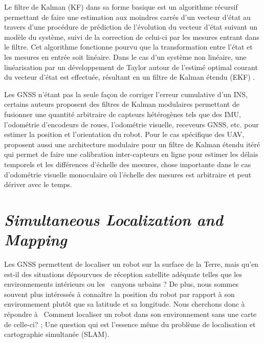 Le filtre de Kalman (KF) dans sa forme basique est un algorithme récursif permettant de faire une estimation aux moindres carrés d'un vecteur d'état au travers d'une procédure de prédiction de l'évolution du vecteur d'état suivant un modèle du système, suivi de la correction de celui-ci par les mesures entrant dans le filtre. Cet algorithme fonctionne pourvu que la transformation entre l'état et les mesures en entrée soit linéaire. Dans le cas d'un système non linéaire, une linéarisation par un développement de Taylor autour de l'estimé optimal courant du vecteur d'état est effectuée, résultant en un filtre de Kalman étendu (EKF) \citep{Chui2017}.

Les GNSS n'étant pas la seule façon de corriger l'erreur cumulative d'un INS, certains auteurs proposent des filtres de Kalman modulaires permettant de fusionner une quantité arbitraire de capteurs hétérogènes tels que des IMU, l'odométrie d'encodeurs de roues, l'odométrie visuelle, receveurs GNSS, etc. \citep{MooreEkf2014} pour estimer la position et l'orientation du robot. Pour le cas spécifique des UAV, \citep{Lynen2013} proposent aussi une architecture modulaire pour un filtre de Kalman étendu itéré qui permet de faire une calibration inter-capteurs en ligne pour estimer les délais temporels et les différences d'échelle des mesures, chose importante dans le cas d'odométrie visuelle monoculaire où l'échelle des mesures est arbitraire et peut dériver avec le temps.

\section{\textit{Simultaneous Localization and Mapping}}\label{subsec:reconstruction}

Les GNSS permettent de localiser un robot sur la surface de la Terre, mais qu'en est-il des situations dépourvues de réception satellite adéquate telles que les environnements intérieurs ou les \guillemotleft \ canyons urbains \guillemotright ? De plus, nous sommes souvent plus intéressés à connaître la position du robot par rapport à son environnement plutôt que sa latitude et sa longitude. Nous cherchons donc à répondre à \guillemotleft \ Comment localiser un robot dans son environnement sans une carte de celle-ci? \guillemotright; Une question qui est l'essence même du problème de localisation et cartographie simultanée (SLAM).

